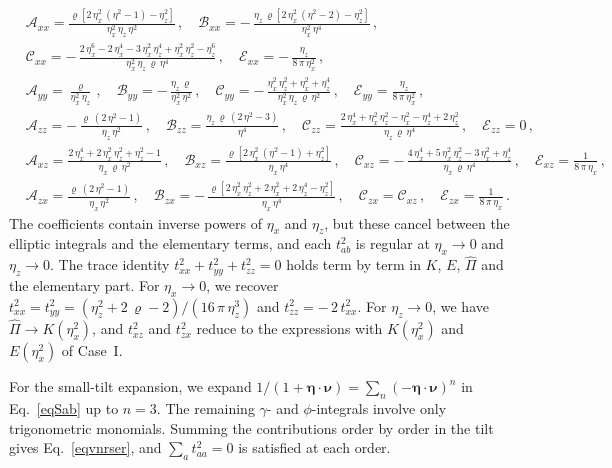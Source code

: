 \documentclass[aps,prb,onecolumn,nofootinbib,citeautoscript,10pt]{revtex4-2}
\newcommand{\bs}[1]{\boldsymbol{#1}}
\def \nn{\nonumber \\}
\begin{document}
\begin{align}
\label{eqvnrcoef}
& \mathcal A_{xx}=\frac{\varrho\left[2\,\eta_x^2\,(\eta^2-1)-\eta_z^2\right]}{\eta_x^2\,\eta_z\,\eta^2}\,, \quad
\mathcal B_{xx}=-\,\frac{\eta_z\,\varrho\left[2\,\eta_x^2\,(\eta^2-2)-\eta_z^2\right]}{\eta_x^2\,\eta^4}\,, \nn &
\mathcal C_{xx}=-\,\frac{2\,\eta_x^6-2\,\eta_x^4-3\,\eta_x^2\,\eta_z^4+\eta_x^2\,\eta_z^2-\eta_z^6}{\eta_x^2\,\eta_z\,\varrho\,\eta^4}\,, \quad
\mathcal E_{xx}=-\,\frac{\eta_z}{8\,\pi\,\eta_x^2}\,, \nn &
\mathcal A_{yy}=\frac{\varrho}{\eta_x^2\,\eta_z}\,, \quad
\mathcal B_{yy}=-\,\frac{\eta_z\,\varrho}{\eta_x^2\,\eta^2}\,, \quad
\mathcal C_{yy}=-\,\frac{\eta_x^2\,\eta_z^2+\eta_x^2+\eta_z^4}{\eta_x^2\,\eta_z\,\varrho\,\eta^2}\,, \quad
\mathcal E_{yy}=\frac{\eta_z}{8\,\pi\,\eta_x^2}\,, \nn &
\mathcal A_{zz}=-\,\frac{\varrho\,(2\,\eta^2-1)}{\eta_z\,\eta^2}\,, \quad
\mathcal B_{zz}=\frac{\eta_z\,\varrho\,(2\,\eta^2-3)}{\eta^4}\,, \quad
\mathcal C_{zz}=\frac{2\,\eta_x^4+\eta_x^2\,\eta_z^2-\eta_x^2-\eta_z^4+2\,\eta_z^2}{\eta_z\,\varrho\,\eta^4}\,, \quad
\mathcal E_{zz}=0\,, \nn &
\mathcal A_{xz}=\frac{2\,\eta_x^4+2\,\eta_x^2\,\eta_z^2+\eta_z^2-1}{\eta_x\,\varrho\,\eta^2}\,, \quad
\mathcal B_{xz}=\frac{\varrho\left[2\,\eta_x^2\,(\eta^2-1)+\eta_z^2\right]}{\eta_x\,\eta^4}\,, \quad
\mathcal C_{xz}=-\,\frac{4\,\eta_x^4+5\,\eta_x^2\,\eta_z^2-3\,\eta_x^2+\eta_z^4}{\eta_x\,\varrho\,\eta^4}\,, \quad
\mathcal E_{xz}=\frac{1}{8\,\pi\,\eta_x}\,, \nn &
\mathcal A_{zx}=\frac{\varrho\,(2\,\eta^2-1)}{\eta_x\,\eta^2}\,, \quad
\mathcal B_{zx}=-\,\frac{\varrho\left[2\,\eta_x^2\,\eta_z^2+2\,\eta_x^2+2\,\eta_z^4-\eta_z^2\right]}{\eta_x\,\eta^4}\,, \quad
\mathcal C_{zx}=\mathcal C_{xz}\,, \quad
\mathcal E_{zx}=\frac{1}{8\,\pi\,\eta_x}\,.
\end{align}
The coefficients contain inverse powers of $\eta_x$ and $\eta_z$, but these cancel between the elliptic integrals and the elementary terms, and each $t^2_{ab}$ is regular at $\eta_x\to0$ and $\eta_z\to0$. The trace identity $t^2_{xx}+t^2_{yy}+t^2_{zz}=0$ holds term by term in $K$, $E$, $\hat\Pi$ and the elementary part. For $\eta_x\to0$, we recover $t^2_{xx}=t^2_{yy}=\left(\eta_z^2+2\,\varrho-2\right)/(16\,\pi\,\eta_z^3)$ and $t^2_{zz}=-\,2\,t^2_{xx}$. For $\eta_z\to0$, we have $\hat\Pi\to K(\eta_x^2)$, and $t^2_{xz}$ and $t^2_{zx}$ reduce to the expressions with $K(\eta_x^2)$ and $E(\eta_x^2)$ of Case~I.

For the small-tilt expansion, we expand $1/(1+\bs\eta\cdot\bs\nu)=\sum_{n}(-\bs\eta\cdot\bs\nu)^n$ in Eq.~\eqref{eqSab} up to $n=3$. The remaining $\gamma$- and $\phi$-integrals involve only trigonometric monomials. Summing the contributions order by order in the tilt gives Eq.~\eqref{eqvnrser}, and $\sum_a t^2_{aa}=0$ is satisfied at each order.
\end{document}

